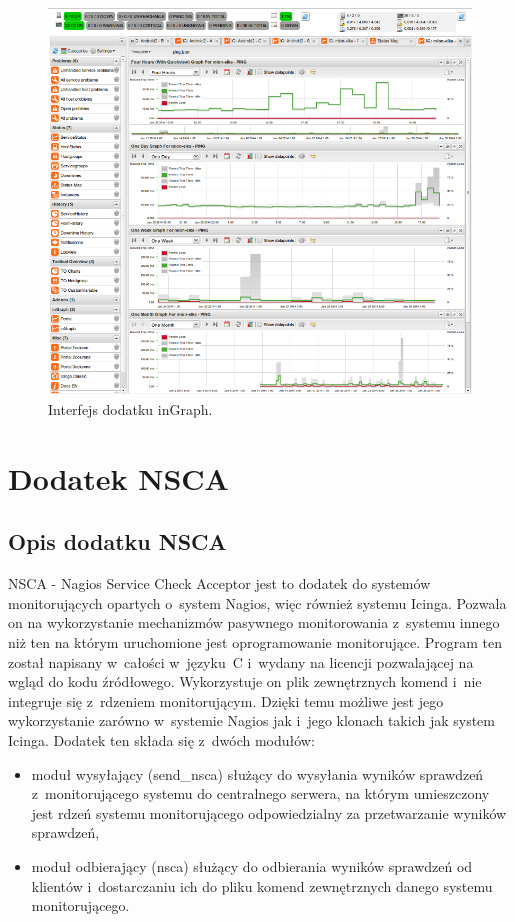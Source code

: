 \begin{figure}[ht]
  \caption{Interfejs dodatku inGraph.}
  \label{fig:inGraph}
\includegraphics[width=1\textwidth]{img/ingraph.png}
\end{figure}


\section[Dodatek NSCA][Dodatek NSCA]{Dodatek NSCA}
\label{sec:NSCA}

\subsection[Opis dodatku NSCA][Opis dodatku NSCA]{Opis dodatku NSCA}

NSCA - Nagios Service Check Acceptor jest to dodatek do systemów
monitorujących opartych o~system Nagios, więc również systemu
Icinga. Pozwala on na wykorzystanie mechanizmów pasywnego
monitorowania z~systemu innego niż ten na którym uruchomione jest
oprogramowanie monitorujące. Program ten został napisany w~całości
w~języku~C i~wydany na licencji pozwalającej na wgląd do kodu
źródłowego. Wykorzystuje on plik zewnętrznych komend i~nie integruje
się z~rdzeniem monitorującym. Dzięki temu możliwe jest jego
wykorzystanie zarówno w~systemie Nagios jak i~jego klonach takich jak
system Icinga. Dodatek ten składa się z~dwóch modułów:

\begin{itemize}
\item moduł wysyłający (send\_nsca) służący do wysyłania wyników
  sprawdzeń z~monitorującego systemu do centralnego serwera, na którym
  umieszczony jest rdzeń systemu monitorującego odpowiedzialny za
  przetwarzanie wyników sprawdzeń,
\item moduł odbierający (nsca) służący do odbierania wyników sprawdzeń
  od klientów i~dostarczaniu ich do pliku komend zewnętrznych danego
  systemu monitorującego.
\end{itemize}

